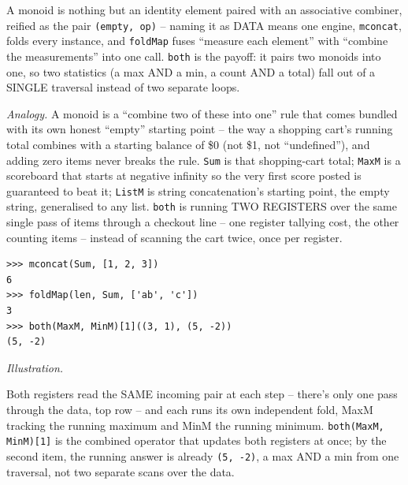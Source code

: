 \documentclass[10pt,letterpaper]{book}
\begin{document}
A monoid is nothing but an identity element paired with an associative combiner, reified as the pair
\texttt{(empty, op)} -- naming it as DATA means one engine, \texttt{mconcat}, folds every instance,
and \texttt{foldMap} fuses ``measure each element'' with ``combine the measurements'' into one call.
\texttt{both} is the payoff: it pairs two monoids into one, so two statistics (a max AND a min, a
count AND a total) fall out of a SINGLE traversal instead of two separate loops.

\textit{Analogy.} A monoid is a ``combine two of these into one'' rule that comes bundled with its
own honest ``empty'' starting point -- the way a shopping cart's running total combines with a
starting balance of \$0 (not \$1, not ``undefined''), and adding zero items never breaks the rule.
\texttt{Sum} is that shopping-cart total; \texttt{MaxM} is a scoreboard that starts at negative
infinity so the very first score posted is guaranteed to beat it; \texttt{ListM} is string
concatenation's starting point, the empty string, generalised to any list. \texttt{both} is running
TWO REGISTERS over the same single pass of items through a checkout line -- one register tallying
cost, the other counting items -- instead of scanning the cart twice, once per register.
\begin{lstlisting}[style=ex]
>>> mconcat(Sum, [1, 2, 3])
6
>>> foldMap(len, Sum, ['ab', 'c'])
3
>>> both(MaxM, MinM)[1]((3, 1), (5, -2))
(5, -2)
\end{lstlisting}
\noindent\textit{Illustration.}
\begin{center}
\end{center}
Both registers read the SAME incoming pair at each step -- there's only one pass through the data,
top row -- and each runs its own independent fold, MaxM tracking the running maximum and MinM the
running minimum. \texttt{both(MaxM, MinM)[1]} is the combined operator that updates both registers
at once; by the second item, the running answer is already \texttt{(5, -2)}, a max AND a min from
one traversal, not two separate scans over the data.
\end{document}
